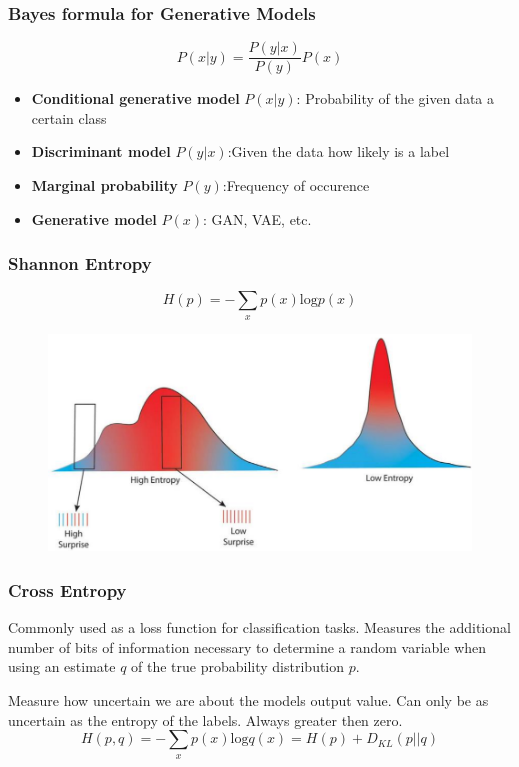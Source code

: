 \subsubsection{Bayes formula for Generative Models}
\[
P(x|y) = \frac{P(y|x)}{P(y)}P(x)
\]

\begin{itemize}
    \item \textbf{Conditional generative model} \(P(x|y)\): Probability of the given data a certain class
    \item \textbf{Discriminant model} \(P(y|x)\):Given the data how likely is a label
    \item \textbf{Marginal probability} \(P(y)\):Frequency of occurence
    \item \textbf{Generative model} \(P(x)\): GAN, VAE, etc. 
\end{itemize}

\subsubsection{Shannon Entropy}
\[
H(p) = - \sum_x p(x) \text{log} p(x)
\]
\begin{figure}[!h]
    \includegraphics[width = \columnwidth]{figures/GenAI1/ShannonEntropy.png}
\end{figure}

\subsubsection{Cross Entropy}
Commonly used as a loss function for classification tasks.
Measures the additional number of bits of information necessary to determine a random variable when using an estimate \(q\) of the true probability distribution \(p\).

Measure how uncertain we are about the models output value.
Can only be as uncertain as the entropy of the labels.
Always greater then zero.
\[
H(p,q) = - \sum_x p(x) \text{log} q(x) = H(p) + D_{KL}(p||q)
\]
